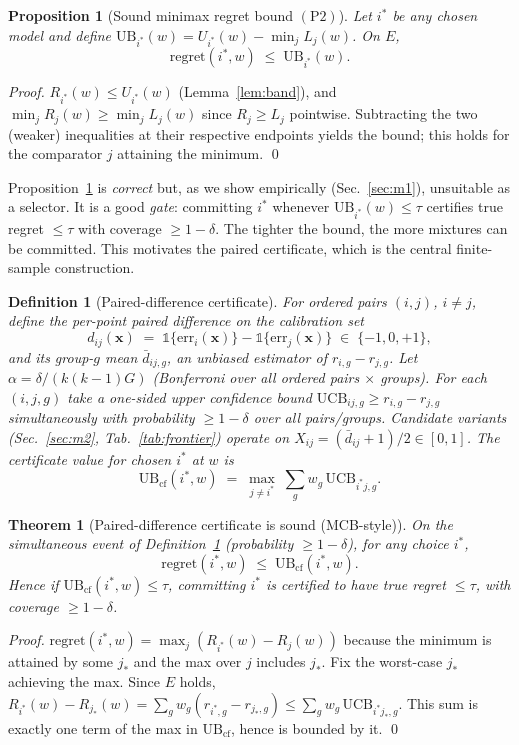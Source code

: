 \documentclass{article}
\newtheorem{theorem}{Theorem}
\newtheorem{proposition}{Proposition}
\newtheorem{definition}{Definition}
\begin{document}
\begin{proposition}[Sound minimax regret bound $(\mathrm{P2})$]
\label{prop:p2}
Let $i^*$ be any chosen model and define
$\mathrm{UB}_{i^*}(w)=U_{i^*}(w)-\min_j L_j(w)$. On $E$,
\[
  \mathrm{regret}(i^*,w)\;\le\;\mathrm{UB}_{i^*}(w).
\]
\end{proposition}
\begin{proof}
$R_{i^*}(w)\le U_{i^*}(w)$ (Lemma~\ref{lem:band}), and
$\min_j R_j(w)\ge \min_j L_j(w)$ since $R_j\ge L_j$ pointwise. Subtracting the two
(weaker) inequalities at their respective endpoints yields the bound; this holds for the
comparator $j$ attaining the minimum. \qed
\end{proof}

Proposition~\ref{prop:p2} is \emph{correct} but, as we show empirically
(Sec.~\ref{sec:m1}), unsuitable as a selector. It is a good \emph{gate}: committing $i^*$
whenever $\mathrm{UB}_{i^*}(w)\le\tau$ certifies true regret $\le\tau$ with coverage
$\ge1-\delta$. The tighter the bound, the more mixtures can be committed. This motivates the
paired certificate, which is the central finite-sample construction.

\begin{definition}[Paired-difference certificate]
\label{def:paired}
For ordered pairs $(i,j)$, $i\ne j$, define the per-point paired difference on the
calibration set
\[
  d_{ij}(\mathbf{x}) \;=\; \mathbb{1}\{\text{err}_i(\mathbf{x})\}
        - \mathbb{1}\{\text{err}_j(\mathbf{x})\} \;\in\; \{-1,0,+1\},
\]
and its group-$g$ mean $\bar d_{ij,g}$, an unbiased estimator of $r_{i,g}-r_{j,g}$.
Let $\alpha=\delta/(k(k-1)G)$ (Bonferroni over all ordered pairs $\times$ groups). For each
$(i,j,g)$ take a one-sided upper confidence bound
$\mathrm{UCB}_{ij,g}\ge r_{i,g}-r_{j,g}$ simultaneously with probability $\ge1-\delta$
over all pairs/groups. Candidate variants (Sec.~\ref{sec:m2}, Tab.~\ref{tab:frontier})
operate on $X_{ij}=(\bar d_{ij}+1)/2\in[0,1]$. The certificate value for chosen $i^*$ at $w$ is
\[
  \mathrm{UB}_{\mathrm{cf}}(i^*,w) \;=\;
  \max_{j\ne i^*}\;\sum_{g} w_g\, \mathrm{UCB}_{i^*j,g}.
\]
\end{definition}

\begin{theorem}[Paired-difference certificate is sound (MCB-style)]
\label{thm:m25}
On the simultaneous event of Definition~\ref{def:paired} (probability $\ge1-\delta$), for
\emph{any} choice $i^*$,
\[
  \mathrm{regret}(i^*,w)\;\le\;\mathrm{UB}_{\mathrm{cf}}(i^*,w).
\]
Hence if $\mathrm{UB}_{\mathrm{cf}}(i^*,w)\le\tau$, committing $i^*$ is certified to have
true regret $\le\tau$, with coverage $\ge1-\delta$.
\end{theorem}
\begin{proof}
$\mathrm{regret}(i^*,w)=\max_j(R_{i^*}(w)-R_j(w))$ because the minimum is attained by some
$j_*$ and the max over $j$ includes $j_*$. Fix the worst-case $j_*$ achieving the max. Since
$E$ holds, $R_{i^*}(w)-R_{j_*}(w)=\sum_g w_g(r_{i^*,g}-r_{j_*,g})
\le \sum_g w_g\,\mathrm{UCB}_{i^*j_*,g}$. This sum is exactly one term of the max in
$\mathrm{UB}_{\mathrm{cf}}$, hence is bounded by it. \qed
\end{proof}
\end{document}
